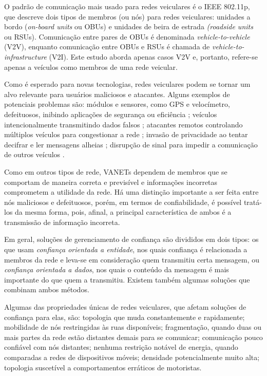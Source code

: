 \begin{resumoextendido}
	O padrão de comunicação mais usado para redes veiculares é o IEEE 802.11p, que descreve dois tipos de membros (ou nós) para redes veiculares: unidades a bordo (\textit{on-board units} ou OBUs) e unidades de beira de estrada \textit(\textit{roadside units} ou RSUs).
	Comunicação entre pares de OBUs é denominada \textit{vehicle-to-vehicle} (V2V), enquanto comunicação entre OBUs e RSUs é chamada de \textit{vehicle-to-infrastructure} (V2I).
	Este estudo aborda apenas casos V2V e, portanto, refere-se apenas a veículos como membros de uma rede veicular.

	Como é esperado para novas tecnologias, redes veiculares podem se tornar um alvo relevante para usuários maliciosos e atacantes.
	Alguns exemplos de potenciais problemas são: 
	módulos e sensores, como GPS e velocímetro, defeituosos, inibindo aplicações de segurança ou eficiência \citep{isaac2010security}; 
	veículos intencionalmente transmitindo dados falsos \citep{golle2004detecting}; 
	atacantes remotos controlando múltiplos veículos para congestionar a rede \citep{garip2015congestion}; 
	invasão de privacidade ao tentar decifrar e ler mensagens alheias \citep{isaac2010security};
	disrupção de sinal para impedir a comunicação de outros veículos \citep{isaac2010security}.
	
	Como em outros tipos de rede, VANETs dependem de membros que se comportam de maneira correta e previsível e informações incorretas comprometem a utilidade da rede.
	Há uma distinção importante a ser feita entre nós maliciosos e defeituosos, porém, em termos de confiabilidade, é possível tratá-los da mesma forma, pois, afinal, a principal característica de ambos é a transmissão de informação incorreta.
	
	Em geral, soluções de gerenciamento de confiança são divididos em dois tipos: os que usam \textit{confiança orientada a entidade}, nos quais confiança é relacionada a membros da rede e leva-se em consideração quem transmitiu certa mensagem, ou \textit{confiança orientada a dados}, nos quais o conteúdo da mensagem é mais importante do que quem a transmitiu.
	Existem também algumas soluções que combinam ambos métodos.
	
	Algumas das propriedades únicas de redes veiculares, que afetam soluções de confiança para elas, são:
	topologia que muda constantemente e rapidamente;
	mobilidade de nós restringidas às ruas disponíveis;
	fragmentação, quando duas ou mais partes da rede estão distantes demais para se comunicar;
	comunicação pouco confiável com nós distantes;
	nenhuma restrição notável de energia, quando comparadas a redes de dispositivos móveis;
	densidade potencialmente muito alta;
	topologia suscetível a comportamentos erráticos de motoristas.
	

\end{resumoextendido}
